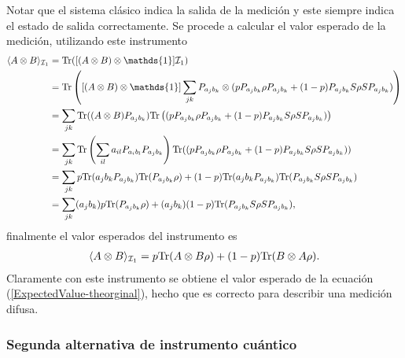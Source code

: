 Notar que el sistema clásico indica la salida de la medición y este siempre indica el estado de salida correctamente. Se procede a calcular el valor esperado de la medición, utilizando este instrumento \begin{equation*}
    \begin{split}
        \la A\otimes B \ra_{\mathcal{I}_1}&=\tr([(A\otimes B) \otimes \mathds{1}]\mathcal{I}_1) \\
        &=\tr\left([(A\otimes B) \otimes \mathds{1}]\sum_{jk}P_{a_j b_k}\otimes (pP_{a_j b_k}\rho P_{a_j b_k}+ (1-p)P_{a_j b_k}S\rho S P_{a_j b_k})\right)\\
        &=\sum_{jk} \tr((A\otimes B) P_{a_j b_k}) \tr\left((pP_{a_j b_k}\rho P_{a_j b_k}+ (1-p)P_{a_j b_k}S\rho S P_{a_j b_k})\right) \\
        &=\sum_{jk} \tr\left(\sum_{il}a_{il}P_{a_i b_l} P_{a_j b_k}\right) \tr((pP_{a_j b_k}\rho P_{a_j b_k}+ (1-p)P_{a_j b_k}S\rho S P_{a_j b_k})) \\
        &=\sum_{jk} p\tr(a_{j}b_k P_{a_j b_k}) \tr(P_{a_j b_k}\rho)+ (1-p)\tr(a_{j}b_k P_{a_j b_k})\tr(P_{a_j b_k}S\rho S P_{a_j b_k}) \\
        &=\sum_{jk}  (a_{j}b_k)p  \tr(P_{a_j b_k}\rho)+(a_{j}b_k) (1-p) \tr(P_{a_j b_k}S\rho S P_{a_j b_k}),\\
    \end{split}
\end{equation*} finalmente el valor esperados del instrumento es \begin{equation}\label{expectedValueFirstInstrument}
    \begin{split}
        \langle A\otimes B \rangle_{\mathcal{I}_1}&=p {\rm Tr}(A\otimes B \rho)+ (1-p){\rm Tr}(B\otimes A \rho ). \\
    \end{split}
\end{equation} Claramente con este instrumento se obtiene el valor esperado de la ecuación ({\ref{ExpectedValue-theorginal}}), hecho que es correcto para describir una medición difusa.


\subsubsection{Segunda alternativa de instrumento cuántico}

